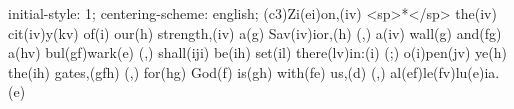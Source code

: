 initial-style: 1;
centering-scheme: english;
(c3)Zi(ei)on,(iv) <sp>*</sp> the(iv) cit(iv)y(kv) of(i) our(h) strength,(iv) a(g) Sav(iv)ior,(h) (,) a(iv) wall(g) and(fg) a(hv) bul(gf)wark(e) (,) shall(iji) be(ih) set(il) there(lv)in:(i) (;) o(i)pen(jv) ye(h) the(ih) gates,(gfh) (,) for(hg) God(f) is(gh) with(fe) us,(d) (,) al(ef)le(fv)lu(e)ia.(e)
